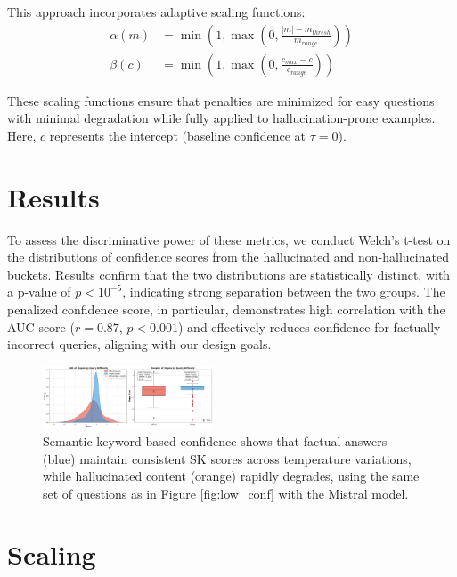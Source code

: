\documentclass[sigconf]{acmart}
\begin{document}
\begin{enumerate}
    This approach incorporates adaptive scaling functions:
    \begin{align}
        \alpha(m) &= \min\left(1, \max\left(0, \frac{|m| - m_{thresh}}{m_{range}}\right)\right) \\
        \beta(c) &= \min\left(1, \max\left(0, \frac{c_{max} - c}{c_{range}}\right)\right)
    \end{align}
    
    These scaling functions ensure that penalties are minimized for easy questions with 
    minimal degradation while fully applied to hallucination-prone examples. Here, $c$ 
    represents the intercept (baseline confidence at $\tau=0$).
\end{enumerate}

\section{Results}

To assess the discriminative power of these metrics, we conduct Welch's t-test on the distributions of confidence scores from the hallucinated and non-hallucinated buckets. Results confirm that the two distributions are statistically distinct, with a p-value of $p < 10^{-5}$, indicating strong separation between the two groups. The penalized confidence score, in particular, demonstrates high correlation with the AUC score ($r = 0.87$, $p < 0.001$) and effectively reduces confidence for factually incorrect queries, aligning with our design goals.

\begin{figure}[ht]
    \centering
    \includegraphics[width=0.45\textwidth]{images/slope_SK_scores.png}
    \caption{Semantic-keyword based confidence shows that factual answers (blue) maintain consistent SK scores across temperature variations, while hallucinated content (orange) rapidly degrades, using the same set of questions as in Figure \ref{fig:low_conf} with the Mistral model.}
    \label{fig:sk_confidence}
\end{figure}


\section{Scaling}
\end{document}
